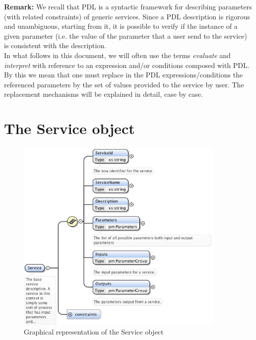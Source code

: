 \documentclass[a4paper,11pt] {ivoa}
\begin{document}
{\bf Remark:} We recall that PDL is a syntactic framework for describing parameters (with related
constraints) of generic services. Since a PDL description is rigorous and unambiguous, starting from
it, it is possible to verify if the instance of a given parameter (i.e. the value of the parameter
that a user send to the service) is consistent with the description.\\
In what follows in this document, we will often use the terms {\it evaluate} and {\it interpret}
with reference to an expression and/or conditions composed with PDL. By this we mean that one must
replace in the PDL expressions/conditions the referenced parameters  by the set of values provided to the
service by user. The replacement mechanisms will be explained in detail, case by case.


\section{The Service object}\label{par-service}

\begin{figure}[htbp]
\begin{center}
\includegraphics[width=0.9\textwidth]{pictures/Service.jpg} 
\caption{Graphical representation of the Service object}
\label{Pic-Service}
\end{center}
\end{figure}
\end{document}
